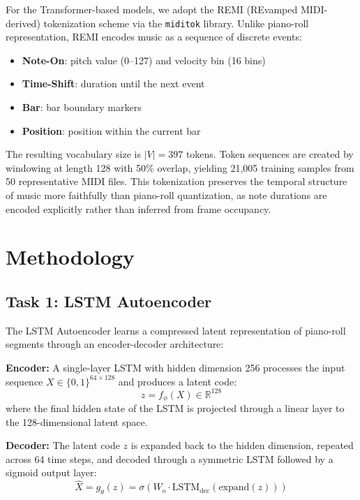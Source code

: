 \documentclass[conference]{IEEEtran}
\begin{document}
For the Transformer-based models, we adopt the REMI (REvamped MIDI-derived) tokenization scheme via the \texttt{miditok} library. Unlike piano-roll representation, REMI encodes music as a sequence of discrete events:

\begin{itemize}
    \item \textbf{Note-On}: pitch value (0--127) and velocity bin (16 bins)
    \item \textbf{Time-Shift}: duration until the next event
    \item \textbf{Bar}: bar boundary markers
    \item \textbf{Position}: position within the current bar
\end{itemize}

The resulting vocabulary size is $|V| = 397$ tokens. Token sequences are created by windowing at length 128 with 50\% overlap, yielding 21,005 training samples from 50 representative MIDI files. This tokenization preserves the temporal structure of music more faithfully than piano-roll quantization, as note durations are encoded explicitly rather than inferred from frame occupancy.

\section{Methodology}

\subsection{Task 1: LSTM Autoencoder}

The LSTM Autoencoder learns a compressed latent representation of piano-roll segments through an encoder-decoder architecture:

\textbf{Encoder:} A single-layer LSTM with hidden dimension 256 processes the input sequence $X \in \{0,1\}^{64 \times 128}$ and produces a latent code:
\begin{equation}
z = f_\phi(X) \in \mathbb{R}^{128}
\end{equation}
where the final hidden state of the LSTM is projected through a linear layer to the 128-dimensional latent space.

\textbf{Decoder:} The latent code $z$ is expanded back to the hidden dimension, repeated across 64 time steps, and decoded through a symmetric LSTM followed by a sigmoid output layer:
\begin{equation}
\hat{X} = g_\theta(z) = \sigma(W_o \cdot \text{LSTM}_\text{dec}(\text{expand}(z)))
\end{equation}
\end{document}
